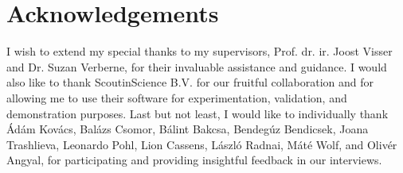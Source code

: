 \documentclass{report}
\begin{document}



\setcounter{page}{3}
\tableofcontents

\chapter*{Acknowledgements}
I wish to extend my special thanks to my supervisors, Prof. dr. ir. Joost Visser and Dr. Suzan Verberne, for their invaluable assistance and guidance. I would also like to thank ScoutinScience B.V. for our fruitful collaboration and for allowing me to use their software for experimentation, validation, and demonstration purposes. Last but not least, I would like to individually thank
Ádám Kovács,
Balázs Csomor,
Bálint Bakcsa,
Bendegúz Bendicsek,
Joana Trashlieva,
Leonardo Pohl,
Lion Cassens,
László Radnai,
Máté Wolf,
and Olivér Angyal,
for participating and providing insightful feedback in our interviews.













\end{document}
